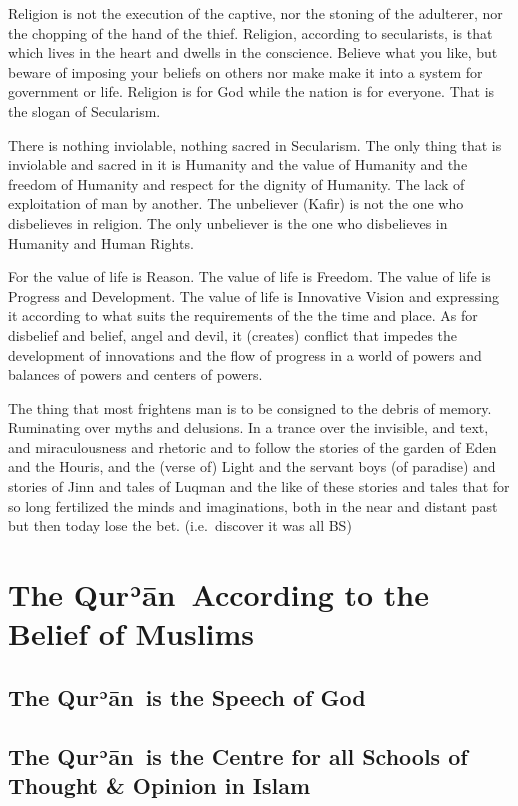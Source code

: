 \documentclass[12pt]{book}
\def \Quran{Qurʾān} %
\begin{document}
Religion is not the execution of the captive, nor the stoning of the adulterer,
nor the chopping of the hand of the thief. Religion, according to secularists,
is that which lives in the heart and dwells in the conscience. Believe what you
like, but beware of imposing your beliefs on others nor make make it into a
system for government or life. Religion is for God while the nation is for
everyone. That is the slogan of Secularism.

There is nothing inviolable, nothing sacred in Secularism. The only thing that
is inviolable and sacred in it is Humanity and the value of Humanity and the
freedom of Humanity and respect for the dignity of Humanity. The lack of
exploitation of man by another. The unbeliever (Kafir) is not the one who
disbelieves in religion. The only unbeliever is the one who disbelieves in
Humanity and Human Rights.

For the value of life is Reason. The value of life is Freedom. The value of
life is Progress and Development. The value of life is Innovative Vision and
expressing it according to what suits the requirements of the the time and
place. As for disbelief and belief, angel and devil, it (creates) conflict that
impedes the development of innovations and the flow of progress in a world of
powers and balances of powers and centers of powers.

The thing that most frightens man is to be consigned to the debris of memory.
Ruminating over myths and delusions. In a trance over the invisible, and text,
and miraculousness and rhetoric and to follow the stories of the garden of Eden
and the Houris, and the (verse of) Light and the servant boys (of paradise) and
stories of Jinn and tales of Luqman and the like of these stories and tales
that for so long fertilized the minds and imaginations, both in the near and
distant past but then today lose the bet. (i.e.\ discover it was all BS)


\chapter{The \Quran\ According to the Belief of Muslims}

\section{The \Quran\ is the Speech of God}

\section{The \Quran\ is the Centre for all
Schools of Thought \& Opinion in Islam}
\end{document}
